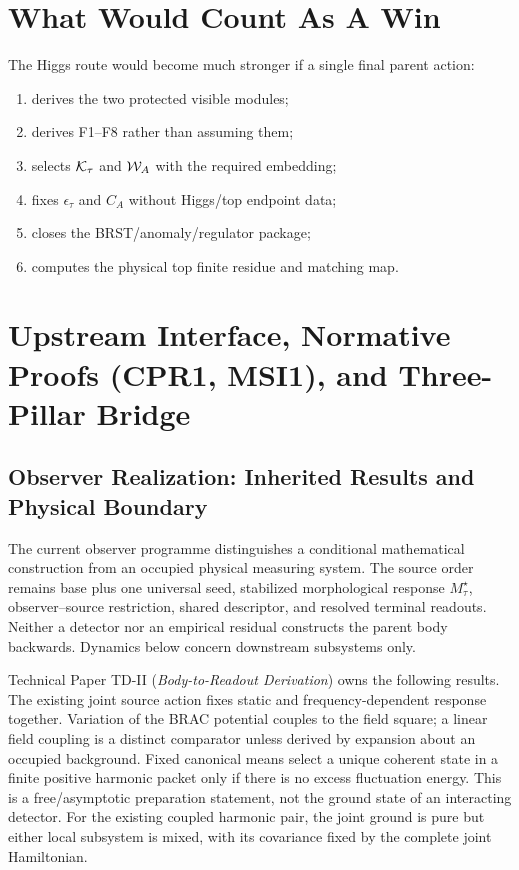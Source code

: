 \documentclass[11pt]{article}
\begin{document}
\section{What Would Count As A Win}
The Higgs route would become much stronger if a single final parent action:
\begin{enumerate}
\item derives the two protected visible modules;
\item derives F1--F8 rather than assuming them;
\item selects ${\cal K}_\tau$ and ${\cal W}_A$ with the required embedding;
\item fixes $\epsilon_\tau$ and $C_A$ without Higgs/top endpoint data;
\item closes the BRST/anomaly/regulator package;
\item computes the physical top finite residue and matching map.
\end{enumerate}

\section{Upstream Interface, Normative Proofs (CPR1, MSI1), and Three-Pillar Bridge}
\label{sec:upstream-interface-normative}

\subsection{Observer Realization: Inherited Results and Physical Boundary}
\label{sec:observer-update-20260914}
The current observer programme distinguishes a conditional mathematical
construction from an occupied physical measuring system. The source order
remains base plus one universal seed, stabilized morphological response
$M_\tau^\star$, observer--source restriction, shared descriptor, and resolved
terminal readouts. Neither a detector nor an empirical residual constructs the
parent body backwards. Dynamics below concern downstream subsystems only.

Technical Paper TD-II (\emph{Body-to-Readout Derivation}) owns the following
results. The existing joint source action fixes static and frequency-dependent
response together. Variation of the BRAC potential couples to the field
square; a linear field coupling is a distinct comparator unless derived by
expansion about an occupied background. Fixed canonical means select a unique
coherent state in a finite positive harmonic packet only if there is no excess
fluctuation energy. This is a free/asymptotic preparation statement, not the
ground state of an interacting detector. For the existing coupled harmonic
pair, the joint ground is pure but either local subsystem is mixed, with its
covariance fixed by the complete joint Hamiltonian.
\end{document}
